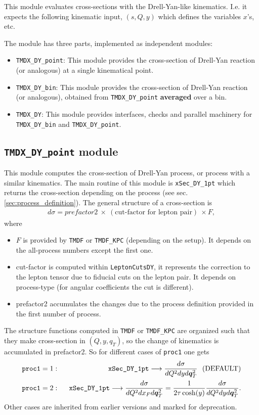 \documentclass[prd,nofootinbib,eqsecnum,final]{revtex4}
\renewcommand{\(}{\left(}
\renewcommand{\)}{\right)}
\renewcommand{\[}{\left[}
\renewcommand{\]}{\right]}
\renewcommand{\vec}[1]{\bm{#1}}
\begin{document}
This module evaluates cross-sections with the Drell-Yan-like kinematics. I.e. it expects the following kinematic input, $(s,Q,y)$ which defines the variables $x$'s, etc.

The module has three parts, implemented as independent modules:
\begin{itemize}
\item \texttt{TMDX\_DY\_point}: This module provides the cross-section of Drell-Yan reaction (or analogous) at a single kinematical point.
\item \texttt{TMDX\_DY\_bin}: This module provides the cross-section of Drell-Yan reaction (or analogous), obtained from \texttt{TMDX\_DY\_point} \textbf{averaged} over a bin.
\item \texttt{TMDX\_DY}: This module provides interfaces, checks and parallel machinery for \texttt{TMDX\_DY\_bin} and \texttt{TMDX\_DY\_point}.
\end{itemize}

\subsection{\texttt{TMDX{\_}DY{\_}point} module}

This module computes the cross-section of Drell-Yan process, or process with a similar kinematics. The main routine of this module is \texttt{xSec\_DY\_1pt} which returns the cross-section depending on the process (see sec. \ref{sec:process_definition}). The general structure of a cross-section is
\begin{eqnarray}
d\sigma = prefactor2~\times~(\text{cut-factor for lepton pair})~\times F,
\end{eqnarray}
where
\begin{itemize}
\item $F$ is provided by \texttt{TMDF} or \texttt{TMDF\_KPC} (depending on the setup). It depends on the all-process numbers except the first one.
\item cut-factor is computed within \texttt{LeptonCutsDY}, it represents the correction to the lepton tensor due to fiducial cuts on the lepton pair. It depends on process-type (for angular coefficients the cut is different).
\item prefactor2 accumulates the changes due to the process definition provided in the first number of process.
\end{itemize}

The structure functions computed in \texttt{TMDF} or \texttt{TMDF\_KPC} are organized such that they make cross-section in $(Q,y,q_T)$, so the change of kinematics is accumulated in prefactor2. So for different cases of \texttt{proc1} one gets
\begin{eqnarray}
\texttt{proc1}=1:~~&&\text{\texttt{xSec\_DY\_1pt}}\longrightarrow \frac{d\sigma}{dQ^2 dy d\vec q_T^2}~~(\text{DEFAULT})
\\
\texttt{proc1}=2:~~&&\text{\texttt{xSec\_DY\_1pt}}\longrightarrow \frac{d\sigma}{dQ^2 dx_F d\vec q_T^2}=\frac{1}{2\tau \cosh(y)}\frac{d\sigma}{dQ^2 dy d\vec q_T^2}.
\end{eqnarray}
Other cases are inherited from earlier versions and marked for deprecation.
\end{document}
